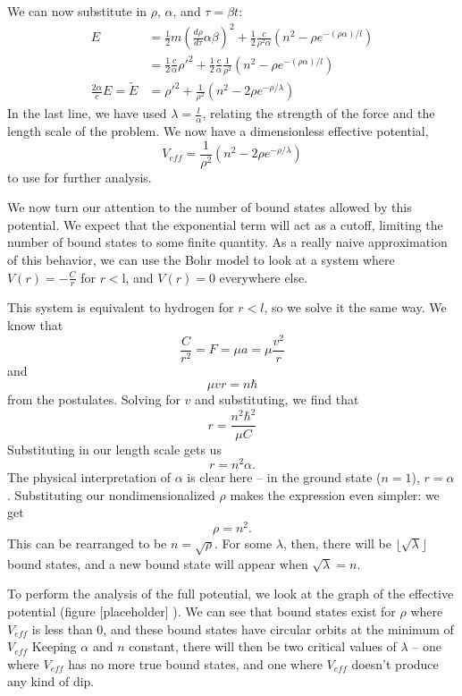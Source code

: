 \documentclass[12pt,twoside]{reedthesis}
\newcommand{\eqn}[1]{\begin{equation}#1\end{equation}}
\begin{document}
We can now substitute in $\rho$, $\alpha$, and $\tau = \beta t$:
\begin{align}
E &= \frac{1}{2}m\left(\frac{d\rho}{d \tau}\alpha \beta\right)^2+\frac{1}{2}\frac{c}{\rho^2 \alpha}(n^2-\rho e^{-(\rho \alpha)/l}) \\
&= \frac{1}{2}\frac{c}{\alpha}\rho'^2 + \frac{1}{2}\frac{c}{\alpha}\frac{1}{\rho^2}(n^2-\rho e^{-(\rho \alpha)/l}) \\
\frac{2\alpha}{c}E = \tilde{E} &= \rho'^2 +\frac{1}{\rho^2}(n^2 - 2\rho e^{-\rho/ \lambda})
\end{align}
In the last line, we have used $\lambda = \frac{l}{\alpha}$, relating the strength of the force and the length scale of the problem. 
We now have a dimensionless effective potential,
\begin{equation}
V_{eff}=\frac{1}{\rho^2}(n^2- 2\rho e^{-\rho/\lambda})
\label{veff}
\end{equation}
to use for further analysis.

We now turn our attention to the number of bound states allowed by this potential. We expect that the exponential term will act as a cutoff, limiting the number of bound states to some finite quantity. As a really naive approximation of this behavior, we can use the Bohr model to look at a system where $V(r) = -\frac{C}{r}$ for $r < $l, and $V(r) = 0$ everywhere else.

This system is equivalent to hydrogen for $r<l$, so we solve it the same way. We know that
\eqn{
\frac{C}{r^2} = F = \mu a = \mu \frac{v^2}{r}
}
and 
\eqn{
\mu v r = n\hbar
}
from the postulates. Solving for $v$ and substituting, we find that
\eqn{
r = \frac{n^2 \hbar^2}{\mu C}
}
Substituting in our length scale gets us 
\eqn{
r = n^2 \alpha \mbox{.}
}
The physical interpretation of $\alpha$ is clear here -- in the ground state ($n = 1$), $r = \alpha$. Substituting our nondimensionalized $\rho$ makes the expression even simpler: we get
\eqn{
\rho = n^2\mbox{.}
}
This can be rearranged to be $n = \sqrt{\rho}$. For some $\lambda$, then, there will be $\lfloor \sqrt{\lambda} \rfloor$ bound states, and a new bound state will appear when $\sqrt{\lambda} = n$.

To perform the analysis of the full potential, we look at the graph of the effective potential (figure [placeholder]%
). 
We can see that bound states exist for $\rho$ where $V_{eff}$ is less than 0, and these bound states have circular orbits at the minimum of $V_{eff}$ Keeping $\alpha$ and $n$ constant, there will then be two critical values of $\lambda$ -- one where $V_{eff}$ has no more true bound states, and one where $V_{eff}$ doesn't produce any kind of dip.
\end{document}
